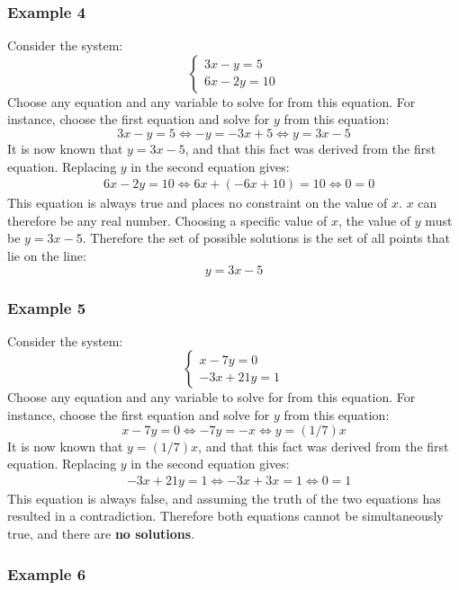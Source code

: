 \documentclass{article}
\begin{document}
\subsubsection*{Example 4}

Consider the system:
\[\left\{\begin{array}{c} 
3x - y = 5 \\
6x - 2y = 10
\end{array}\right.\] 
Choose any equation and any variable to solve for from this equation. For instance, choose the first equation and solve for \(y\) from this equation:
\[3x - y = 5 \iff -y = -3x + 5 \iff y = 3x - 5\]
It is now known that \(y = 3x - 5\), and that this fact was derived from the first equation. Replacing \(y\) in the second equation gives:
\begin{align*}
& 6x - 2y = 10 
\iff 6x + (-6x + 10) = 10 
\iff 0 = 0
\end{align*}
This equation is always true and places no constraint on the value of \(x\). \(x\) can therefore be any real number. Choosing a specific value of \(x\), the value of \(y\) must be \(y = 3x - 5\). Therefore the set of possible solutions is the set of all points that lie on the line:
\[y = 3x - 5\] 


\subsubsection*{Example 5}

Consider the system:
\[\left\{\begin{array}{c} 
x - 7y = 0 \\
-3x + 21y = 1
\end{array}\right.\] 
Choose any equation and any variable to solve for from this equation. For instance, choose the first equation and solve for \(y\) from this equation:
\[x - 7y = 0 \iff -7y = -x \iff y = (1/7)x\]
It is now known that \(y = (1/7)x\), and that this fact was derived from the first equation. Replacing \(y\) in the second equation gives:
\begin{align*}
& -3x + 21y = 1 
\iff -3x + 3x = 1 
\iff 0 = 1
\end{align*}
This equation is always false, and assuming the truth of the two equations has resulted in a contradiction. Therefore both equations cannot be simultaneously true, and there are {\bf no solutions}.


\subsubsection*{Example 6}
\end{document}
